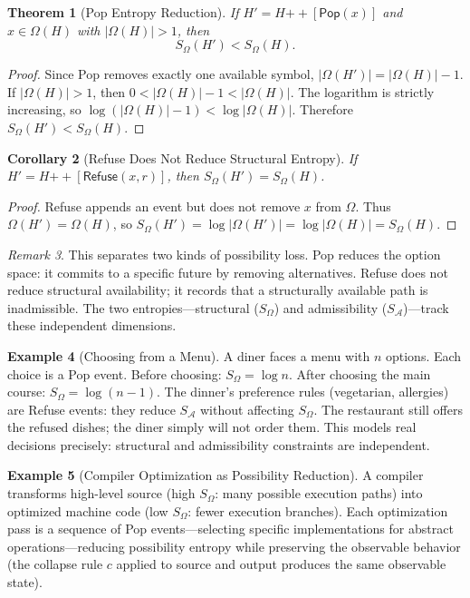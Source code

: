 \documentclass[12pt, a4paper, openany]{book}
\theoremstyle{plain}
\newtheorem{theorem}{Theorem}[chapter]
\newtheorem{corollary}[theorem]{Corollary}
\theoremstyle{definition}
\newtheorem{example}[theorem]{Example}
\theoremstyle{remark}
\newtheorem{remark}[theorem]{Remark}
\newcommand{\Pop}{\mathsf{Pop}}
\newcommand{\Refuse}{\mathsf{Refuse}}
\newcommand{\calA}{\mathcal{A}}
\begin{document}
\begin{theorem}[Pop Entropy Reduction]
If $H' = H \mathbin{++} [\Pop(x)]$ and $x \in \Omega(H)$ with $|\Omega(H)| > 1$, then
\[
S_\Omega(H') < S_\Omega(H).
\]
\end{theorem}

\begin{proof}
Since Pop removes exactly one available symbol,
$|\Omega(H')| = |\Omega(H)| - 1$.
If $|\Omega(H)| > 1$, then $0 < |\Omega(H)| - 1 < |\Omega(H)|$.
The logarithm is strictly increasing, so
$\log(|\Omega(H)| - 1) < \log|\Omega(H)|$.
Therefore $S_\Omega(H') < S_\Omega(H)$.
\end{proof}

\begin{corollary}[Refuse Does Not Reduce Structural Entropy]
If $H' = H \mathbin{++} [\Refuse(x,r)]$, then $S_\Omega(H') = S_\Omega(H)$.
\end{corollary}

\begin{proof}
Refuse appends an event but does not remove $x$ from $\Omega$.
Thus $\Omega(H') = \Omega(H)$, so $S_\Omega(H') = \log|\Omega(H')| = \log|\Omega(H)| = S_\Omega(H)$.
\end{proof}

\begin{remark}
This separates two kinds of possibility loss. Pop reduces the option space:
it commits to a specific future by removing alternatives. Refuse does not reduce
structural availability; it records that a structurally available path is
inadmissible. The two entropies---structural ($S_\Omega$) and admissibility
($S_{\calA}$)---track these independent dimensions.
\end{remark}

\begin{example}[Choosing from a Menu]
A diner faces a menu with $n$ options. Each choice is a Pop event. Before
choosing: $S_\Omega = \log n$. After choosing the main course: $S_\Omega = \log(n-1)$.
The dinner's preference rules (vegetarian, allergies) are Refuse events: they
reduce $S_{\calA}$ without affecting $S_\Omega$. The restaurant still offers the
refused dishes; the diner simply will not order them. This models real decisions
precisely: structural and admissibility constraints are independent.
\end{example}

\begin{example}[Compiler Optimization as Possibility Reduction]
A compiler transforms high-level source (high $S_\Omega$: many possible
execution paths) into optimized machine code (low $S_\Omega$: fewer execution
branches). Each optimization pass is a sequence of Pop events---selecting specific
implementations for abstract operations---reducing possibility entropy while
preserving the observable behavior (the collapse rule $c$ applied to source
and output produces the same observable state).
\end{example}
\end{document}
